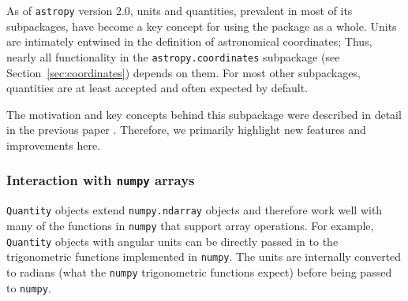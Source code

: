 \documentclass[modern]{aastex61}
\newcommand{\package}[1]{\texttt{#1}\xspace}
\newcommand{\astropypkg}{\package{astropy}}
\newcommand{\sectionname}{Section\xspace}
\newcommand{\inlinecomment}[2]{\todo[inline]{#1: #2}\xspace}
\begin{document}

As of \astropypkg version 2.0, units and quantities, prevalent in most of its
subpackages, have become a key concept for using the package as a whole.
Units are intimately entwined in the definition of astronomical coordinates;
Thus, nearly all functionality in the \texttt{astropy.coordinates} subpackage
(see \sectionname~\ref{sec:coordinates}) depends on them.
For most other subpackages, quantities are at least accepted and often expected
by default.

The motivation and key concepts behind this subpackage were described in detail
in the previous paper \citep{astropy}. Therefore, we primarily highlight new
features and improvements here.

\subsubsection{Interaction with \package{numpy} arrays}

\texttt{Quantity} objects extend
\texttt{numpy.ndarray} objects and therefore
work well with many of the functions in \texttt{numpy} that support
array operations. For example, \texttt{Quantity} objects with angular
units can be directly passed in to the trigonometric functions implemented in
\texttt{numpy}. The units are internally converted to radians (what the \texttt{numpy}
trigonometric functions expect) before being passed to \texttt{numpy}.

\end{document}

